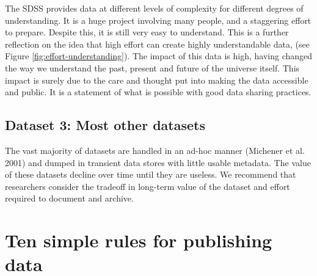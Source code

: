 \documentclass[
]{article}
\begin{document}
The SDSS provides data at different levels of complexity for different degrees of understanding. It is a huge project involving many people, and a staggering effort to prepare. Despite this, it is still very easy to understand. This is a further reflection on the idea that high effort can create highly understandable data, (see Figure \ref{fig:effort-understanding}). The impact of this data is high, having changed the way we understand the past, present and future of the universe itself. This impact is surely due to the care and thought put into making the data accessible and public. It is a statement of what is possible with good data sharing practices.

\hypertarget{ex-data-3}{%
\subsection{Dataset 3: Most other datasets}\label{ex-data-3}}

The vast majority of datasets are handled in an ad-hoc manner (Michener et al. 2001) and dumped in transient data stores with little usable metadata. The value of these datasets decline over time until they are useless. We recommend that researchers consider the tradeoff in long-term value of the dataset and effort required to document and archive.

\hypertarget{ten-rules}{%
\section{Ten simple rules for publishing data}\label{ten-rules}}
\end{document}
